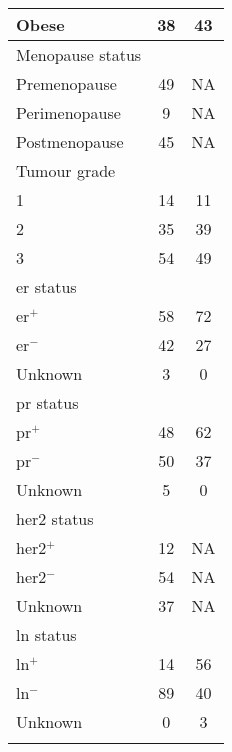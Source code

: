 \begin{ThreePartTable}
\begin{longtable}{lcc}
		\hspace{1em} Obese                   & 38 & 43 \\
		\hline
		\rule{0pt}{2.25ex}Menopause status  \\
		\hspace{1em} Premenopause            & 49 & NA\tnote{1}\\
		\hspace{1em} Perimenopause           & 9  & NA \\
		\hspace{1em} Postmenopause           & 45 & NA \\
		\hline
		\rule{0pt}{2.25ex}Tumour grade      \\
		\hspace{1em} 1                       & 14 & 11 \\
		\hspace{1em} 2                       & 35 & 39 \\
		\hspace{1em} 3                       & 54 & 49 \\
		\hline
		\rule{0pt}{2.25ex}\gls{er} status   \\
		\hspace{1em} \gls{er}$^+$            & 58 & 72 \\
		\hspace{1em} \gls{er}$^-$            & 42 & 27 \\
		\hspace{1em} Unknown                 & 3  & 0  \\
		\hline
		\rule{0pt}{2.25ex}\gls{pr} status   \\
		\hspace{1em} \gls{pr}$^+$            & 48 & 62 \\
		\hspace{1em} \gls{pr}$^-$            & 50 & 37 \\
		\hspace{1em} Unknown                 & 5  & 0  \\
		\hline
		\rule{0pt}{2.25ex}\gls{her2} status \\
		\hspace{1em} \gls{her2}$^+$          & 12 & NA \\
		\hspace{1em} \gls{her2}$^-$          & 54 & NA \\
		\hspace{1em} Unknown                 & 37 & NA \\
		\hline
		\rule{0pt}{2.25ex}\gls{ln} status   \\
		\hspace{1em} \gls{ln}$^+$            & 14 & 56\\
		\hspace{1em} \gls{ln}$^-$            & 89 & 40\\
		\hspace{1em} Unknown                 & 0  & 3 \\
		\hline
		\hline
		\hspace{12em}\insertTableNotes
	\end{longtable}
\end{ThreePartTable}

